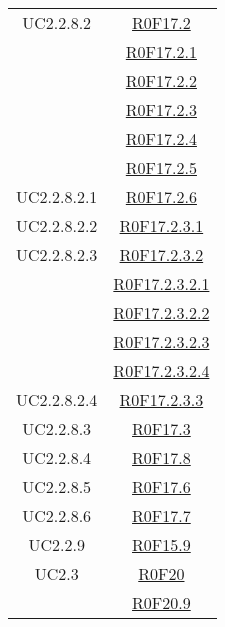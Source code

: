 \documentclass[../AnalisiDeiRequisiti.tex]{subfiles}
\begin{document}
\begin{longtable}{|c|c|}
	UC2.2.8.2 & \hyperlink{R0F17.2}{R0F17.2}\\& \hyperlink{R0F17.2.1}{R0F17.2.1}\\& \hyperlink{R0F17.2.2}{R0F17.2.2}\\& \hyperlink{R0F17.2.3}{R0F17.2.3}\\& \hyperlink{R0F17.2.4}{R0F17.2.4}\\& \hyperlink{R0F17.2.5}{R0F17.2.5}\\\hline
	UC2.2.8.2.1 & \hyperlink{R0F17.2.6}{R0F17.2.6}\\\hline
	UC2.2.8.2.2 & \hyperlink{R0F17.2.3.1}{R0F17.2.3.1}\\\hline
	UC2.2.8.2.3 & \hyperlink{R0F17.2.3.2}{R0F17.2.3.2}\\& \hyperlink{R0F17.2.3.2.1}{R0F17.2.3.2.1}\\& \hyperlink{R0F17.2.3.2.2}{R0F17.2.3.2.2}\\& \hyperlink{R0F17.2.3.2.3}{R0F17.2.3.2.3}\\& \hyperlink{R0F17.2.3.2.4}{R0F17.2.3.2.4}\\\hline
	UC2.2.8.2.4 & \hyperlink{R0F17.2.3.3}{R0F17.2.3.3}\\\hline
	UC2.2.8.3 & \hyperlink{R0F17.3}{R0F17.3}\\\hline
	UC2.2.8.4 & \hyperlink{R0F17.8}{R0F17.8}\\\hline
	UC2.2.8.5 & \hyperlink{R0F17.6}{R0F17.6}\\\hline
	UC2.2.8.6 & \hyperlink{R0F17.7}{R0F17.7}\\\hline
	UC2.2.9 & \hyperlink{R0F15.9}{R0F15.9}\\\hline
	UC2.3 & \hyperlink{R0F20}{R0F20}\\& \hyperlink{R0F20.9}{R0F20.9}\\\hline

\end{longtable}
\end{document}
